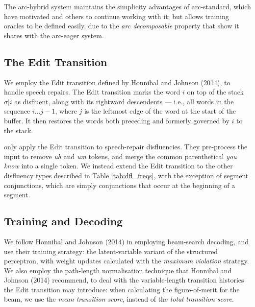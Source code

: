\documentclass[11pt,letterpaper]{article}
\begin{document}
The arc-hybrid system maintains the simplicity advantages of arc-standard, which
have motivated \citet{huang:10} and others to continue working with it; but allows
training oracles to be defined easily, due to the \emph{arc decomposable}
property that \citet{goldberg:13} show it shares with the arc-eager system.

\subsection{The Edit Transition}
\label{sec:edit}
We employ the Edit transition defined by Honnibal and Johnson (2014), to handle
speech repairs.
The Edit transition marks the word $i$ on top of the stack $\sigma | i$ as
disfluent, along with its rightward descendents --- i.e., all words in the
sequence $i...j-1$, where $j$ is the leftmost edge of the word at the start of
the buffer. It then restores the words both preceding and formerly governed by
$i$ to the stack.


\citet{honnibal:14} only apply the Edit transition to speech-repair disfluencies.
They pre-process the input to remove \emph{uh} and \emph{um} tokens, and merge
the common parenthetical \emph{you know} into a single token.
We instead extend the Edit transition to the other disfluency types described
in Table \ref{tab:dfl_freqs}, with the exception of segment conjunctions, which
are simply conjunctions that occur at the beginning of a segment.

\subsection{Training and Decoding}

We follow Honnibal and Johnson (2014) in employing beam-search decoding, and
use their training strategy: the \citet{sun:09} latent-variable
variant of the \citet{collins:02} structured perceptron, with weight updates
calculated with the \citet{huang:12} \emph{maximum violation} strategy.  We
also employ the path-length normalisation technique that Honnibal and Johnson (2014)
recommend, to deal with the variable-length transition histories the Edit transition
may introduce: 
when calculating the figure-of-merit for the beam, we use the
\emph{mean transition score}, instead of the \emph{total transition score}.
\end{document}

